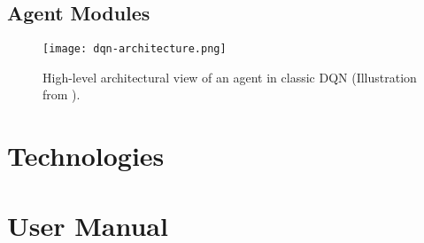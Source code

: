 \subsection{Agent Modules} \label{section:agent-modules}

\begin{figure}[h]
    \centering
    \texttt{[image: dqn-architecture.png]}
    \caption{High-level architectural view of an agent in classic DQN (Illustration from \cite{mpmdrl}).}
    \label{fig:dqn-architecture}
\end{figure}



\section{Technologies} \label{section:technologies}

\section{User Manual} \label{section:user-manual}
